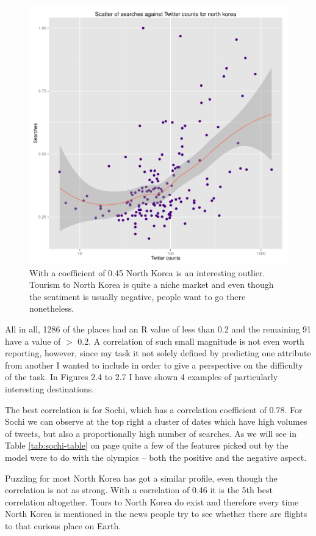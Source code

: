 \documentclass[minf,twoside,singlespacing,parskip,frontabs,notimes,11pt]{infthesis}
\begin{document}
\begin{figure}[]
\includegraphics[scale=0.65]{north-korea}
\caption{With a coefficient of 0.45 North Korea is an interesting outlier. Tourism to North Korea is quite a niche market and even though the sentiment is usually negative, people want to go there nonetheless.  }
\end{figure}


All in all, 1286 of the places had an R value of less than 0.2 and the remaining 91 have a value of $>$ 0.2. A correlation of such small magnitude is not even worth reporting, however, since my task it not solely defined by predicting one attribute from another I wanted to include in order to give a perspective on the difficulty of the task. In Figures 2.4 to 2.7 I have shown 4 examples of particularly interesting destinations. 


The best correlation is for Sochi, which has a correlation coefficient of 0.78. For Sochi we can observe at the top right a cluster of dates which have high volumes of tweets, but also a proportionally high number of searches. As we will see in Table \ref{tab:sochi-table} on page \pageref{tab:sochi-table} quite a few of the features picked out by the model were to do with the olympics -- both the positive and the negative aspect. 

Puzzling for most North Korea has got a similar profile, even though the correlation is not as strong. With a correlation of 0.46 it is the 5th best correlation altogether. Tours to North Korea do exist and therefore every time North Korea is mentioned in the news people try to see whether there are flights to that curious place on Earth.
\end{document}
